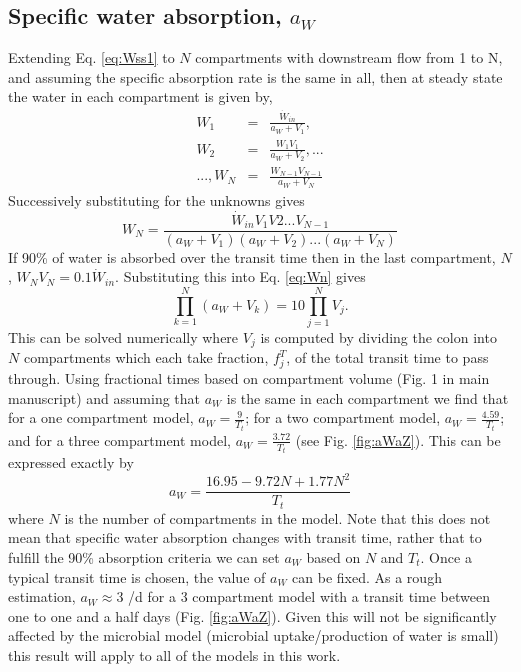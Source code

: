 \documentclass[a4paper]{article}
\begin{document}
\subsection{Specific water absorption, $a_W$}
Extending Eq. \ref{eq:Wss1} to $N$ compartments with downstream flow from 1 to N, and assuming the specific absorption rate is the same in all, then at steady state the water in each compartment is given by,
\begin{eqnarray}
    W_1&=&\frac{\dot{W}_{in}}{a_W+V_1},\\
    W_2&=&\frac{W_1V_1}{a_W+V_2},...\\
    ..., W_N&=&\frac{W_{N-1}V_{N-1}}{a_W+V_N}
\end{eqnarray}
Successively substituting for the unknowns gives 
\begin{equation}
    W_N=\frac{\dot{W}_{in}V_1V2...V_{N-1}}{(a_W+V_1)(a_W+V_2)...(a_W+V_N)}
    \label{eq:Wn}
\end{equation}
If 90\% of water is absorbed over the transit time then in the last compartment, $N$, $W_NV_N=0.1\dot{W}_{in}$. Substituting this into Eq. \ref{eq:Wn} gives
\begin{equation}
    \prod_{k=1}^N(a_W+V_k)=10\prod_{j=1}^NV_j.
\end{equation}
This can be solved numerically where $V_j$ is computed by dividing the colon into $N$ compartments which each take fraction, $f^T_j$, of the total transit time to pass through. Using fractional times based on compartment volume (Fig. 1 in main manuscript) and assuming that $a_W$ is the same in each compartment we find that for a one compartment model, $a_W=\frac{9}{T_t}$; for a two compartment model, $a_W=\frac{4.59}{T_t}$; and for a three compartment model, $a_W=\frac{3.72}{T_t}$ (see Fig. \ref{fig:aWaZ}). This can be expressed exactly by
\begin{equation}
    a_W=\frac{16.95-9.72N+1.77N^2}{T_t}\label{eq:aW}
\end{equation}
where $N$ is the number of compartments in the model. Note that this does not mean that specific water absorption changes with transit time, rather that to fulfill the 90\% absorption criteria we can set $a_W$ based on $N$ and $T_t$. 
Once a typical transit time is chosen, the value of $a_W$ can be fixed.
As a rough estimation, $a_W\approx 3$ /d for a 3 compartment model with a transit time between one to one and a half days (Fig. \ref{fig:aWaZ}).
Given this will not be significantly affected by the microbial model (microbial uptake/production of water is small) this result will apply to all of the models in this work.
\end{document}
